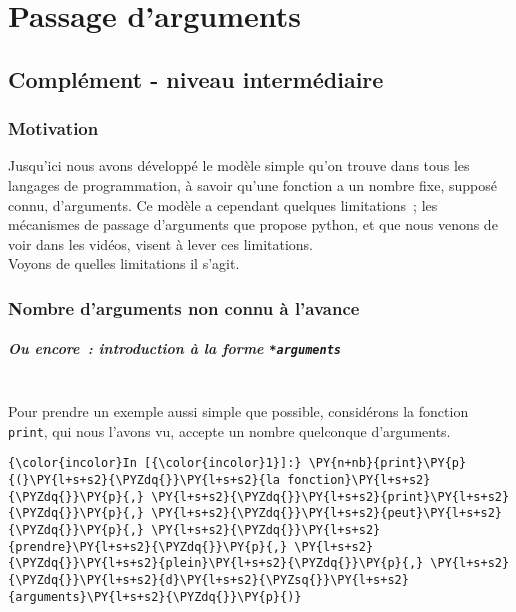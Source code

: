     \hypertarget{passage-darguments}{%
\section{Passage d'arguments}\label{passage-darguments}}

    \hypertarget{compluxe9ment---niveau-intermuxe9diaire}{%
\subsection{Complément - niveau
intermédiaire}\label{compluxe9ment---niveau-intermuxe9diaire}}

    \hypertarget{motivation}{%
\subsubsection{Motivation}\label{motivation}}

    Jusqu'ici nous avons développé le modèle simple qu'on trouve dans tous
les langages de programmation, à savoir qu'une fonction a un nombre
fixe, supposé connu, d'arguments. Ce modèle a cependant quelques
limitations~; les mécanismes de passage d'arguments que propose python,
et que nous venons de voir dans les vidéos, visent à lever ces
limitations.\\

Voyons de quelles limitations il s'agit.

    \hypertarget{nombre-darguments-non-connu-uxe0-lavance}{%
\subsubsection{Nombre d'arguments non connu à
l'avance}\label{nombre-darguments-non-connu-uxe0-lavance}}

    \hypertarget{ou-encore-introduction-uxe0-la-forme-arguments}{%
\subparagraph{\texorpdfstring{Ou encore~: introduction à la forme
\texttt{*arguments}}{Ou encore~: introduction à la forme *arguments}\\\\}\label{ou-encore-introduction-uxe0-la-forme-arguments}}

    Pour prendre un exemple aussi simple que possible, considérons la
fonction \texttt{print}, qui nous l'avons vu, accepte un nombre
quelconque d'arguments.

    \begin{Verbatim}[commandchars=\\\{\}]
{\color{incolor}In [{\color{incolor}1}]:} \PY{n+nb}{print}\PY{p}{(}\PY{l+s+s2}{\PYZdq{}}\PY{l+s+s2}{la fonction}\PY{l+s+s2}{\PYZdq{}}\PY{p}{,} \PY{l+s+s2}{\PYZdq{}}\PY{l+s+s2}{print}\PY{l+s+s2}{\PYZdq{}}\PY{p}{,} \PY{l+s+s2}{\PYZdq{}}\PY{l+s+s2}{peut}\PY{l+s+s2}{\PYZdq{}}\PY{p}{,} \PY{l+s+s2}{\PYZdq{}}\PY{l+s+s2}{prendre}\PY{l+s+s2}{\PYZdq{}}\PY{p}{,} \PY{l+s+s2}{\PYZdq{}}\PY{l+s+s2}{plein}\PY{l+s+s2}{\PYZdq{}}\PY{p}{,} \PY{l+s+s2}{\PYZdq{}}\PY{l+s+s2}{d}\PY{l+s+s2}{\PYZsq{}}\PY{l+s+s2}{arguments}\PY{l+s+s2}{\PYZdq{}}\PY{p}{)}
\end{Verbatim}



